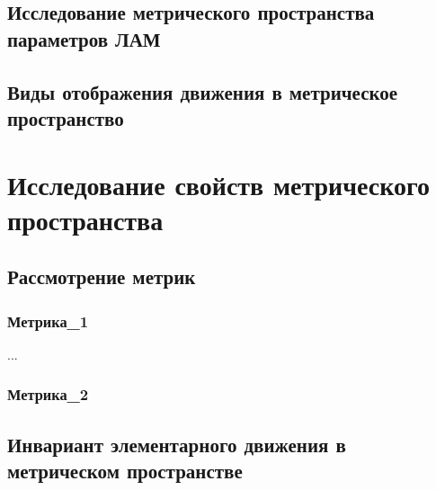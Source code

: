 \documentclass[12pt, fleqn, unicode]{article}
\begin{document}






\subsection{Исследование метрического пространства параметров ЛАМ}

\subsection{Виды отображения движения в метрическое пространство}


\newpage
\section{Исследование свойств метрического пространства}


\subsection{Рассмотрение метрик}

\subsubsection{Метрика_1}
...
\subsubsection{Метрика_2}


\subsection{Инвариант элементарного движения в метрическом пространстве}
\end{document}
